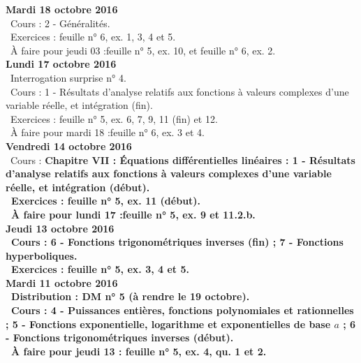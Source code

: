 \documentclass[12pt,a4paper]{article}
\begin{document}
\noindent\textbf{\bf Mardi 18 octobre 2016}\\
\bu\ Cours : 2 - Généralités.\\
\bu\ Exercices : feuille n° 6, ex. 1, 3, 4 et 5.\\
\bu\ À faire pour jeudi 03 :feuille n° 5, ex. 10, et feuille n° 6, ex. 2.\vspace{.4cm}\\

\noindent\textbf{Lundi 17 octobre 2016}\\
\bu\ Interrogation surprise n° 4.\\
\bu\ Cours : 1 - Résultats d'analyse relatifs aux fonctions à valeurs complexes d'une variable réelle, et 
intégration (fin).\\
\bu\ Exercices : feuille n° 5, ex. 6, 7, 9, 11 (fin) et 12.\\
\bu\ À faire pour mardi 18 :feuille n° 6, ex. 3 et 4.\vspace{.4cm}\\
   
\noindent\textbf{Vendredi 14 octobre 2016}\\
\bu\ Cours : \bf Chapitre VII \rm : Équations différentielles linéaires : 1 - Résultats d'analyse relatifs aux 
fonctions à valeurs complexes d'une variable réelle, et intégration (début).\\
\bu\ Exercices : feuille n° 5, ex. 11 (début).\\
\bu\ À faire pour lundi 17 :feuille n° 5, ex. 9 et 11.2.b.\vspace{.4cm}\\

\noindent\textbf{Jeudi 13 octobre 2016}\\
\bu\ Cours :  6 - Fonctions trigonométriques inverses (fin) ; 7 - Fonctions hyperboliques.\\
\bu\ Exercices : feuille n° 5, ex. 3, 4 et 5.\vspace{.4cm}\\

\noindent\textbf{\bf Mardi 11 octobre 2016}\\
\bu\ Distribution : DM n° 5 (à rendre le 19 octobre).\\
\bu\ Cours : 4 - Puissances entières, fonctions 
polynomiales et rationnelles ; 5 - Fonctions exponentielle, logarithme et 
exponentielles de base $a$ ; 6 - Fonctions trigonométriques inverses (début).\\
\bu\ À faire pour jeudi 13 : feuille n° 5, ex. 4, qu. 1 et 2.\vspace{.4cm}\\
\end{document}
